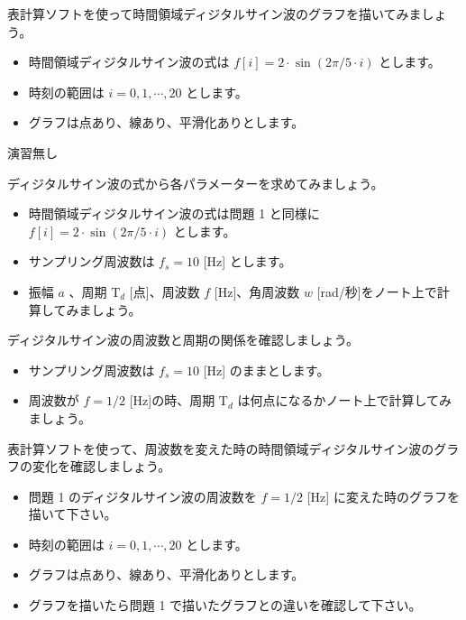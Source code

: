 \documentclass[a4paper]{jarticle}
\begin{document}



 表計算ソフトを使って時間領域ディジタルサイン波のグラフを描いてみましょう。\par
\vspace{1zh}
\begin{itemize}
\item 時間領域ディジタルサイン波の式は $f[i] = 2 \cdot \sin( 2\pi / 5 \cdot i )$ とします。
\item 時刻の範囲は $i = 0, 1,  \cdots, 20$ とします。
\item グラフは点あり、線あり、平滑化ありとします。
\end{itemize}


\vspace{2zh}
\noindent 演習無し


 ディジタルサイン波の式から各パラメーターを求めてみましょう。
\par\vspace{1zh}
\begin{itemize}
\item 時間領域ディジタルサイン波の式は問題 1 と同様に $f[i] = 2 \cdot \sin( 2\pi / 5 \cdot i )$ とします。
\item サンプリング周波数は $f_s = 10$ [Hz] とします。
\item 振幅 $a$ 、周期 $\textrm{T}_d$ [点]、周波数 $f$ [Hz]、角周波数 $w$ [rad/秒]をノート上で計算してみましょう。
\end{itemize}

 ディジタルサイン波の周波数と周期の関係を確認しましょう。
\par\vspace{1zh}
\begin{itemize}
\item サンプリング周波数は $f_s = 10$ [Hz] のままとします。
\item 周波数が $f = 1/2$ [Hz]の時、周期 $\textrm{T}_d$ は何点になるかノート上で計算してみましょう。
\end{itemize}

 表計算ソフトを使って、周波数を変えた時の時間領域ディジタルサイン波のグラフの変化を確認しましょう。
\par\vspace{1zh}
\begin{itemize}
\item 問題 1 のディジタルサイン波の周波数を $f = 1/2$ [Hz] に変えた時のグラフを描いて下さい。
\item 時刻の範囲は $i = 0, 1,  \cdots, 20$ とします。
\item グラフは点あり、線あり、平滑化ありとします。
\item グラフを描いたら問題 1 で描いたグラフとの違いを確認して下さい。
\end{itemize}
\end{document}
